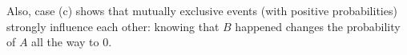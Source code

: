 \begin{solution}
\begin{remark}
		Also, case (c) shows that mutually exclusive events (with positive
		probabilities) strongly influence each other: knowing that $B$
		happened changes the probability of $A$ all the way to $0$.
	\end{remark}
\end{solution}
